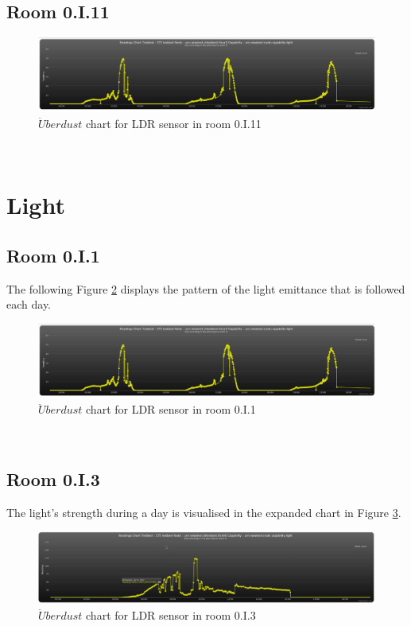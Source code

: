 \documentclass[12pt,a4paper,draft]{report}
\begin{document}
\subsection{Room 0.I.11}
%
\begin{figure}[H]
\centering
	\includegraphics*[scale=0.3]{light_1}
	\caption{$\ddot{U}berdust$ chart for LDR sensor in room 0.I.11}
	\label{chart_light_1}
\end{figure}
\ \\
%
\section{Light}
%
\subsection{Room 0.I.1}
%
The following Figure \ref{chart_light_1} displays the pattern of the light emittance that is followed each day.
\begin{figure}[H]
\centering
	\includegraphics*[scale=0.3]{light_1}
	\caption{$\ddot{U}berdust$ chart for LDR sensor in room 0.I.1}
	\label{chart_light_1}
\end{figure}
\ \\
%
\subsection{Room 0.I.3}
%
The light's strength during a day is visualised in the expanded chart in Figure \ref{chart_light_3}.
\begin{figure}[H]
\centering
	\includegraphics*[scale=0.3]{light_3}
	\caption{$\ddot{U}berdust$ chart for LDR sensor in room 0.I.3}
	\label{chart_light_3}
\end{figure}
\ \\
%
\end{document}

